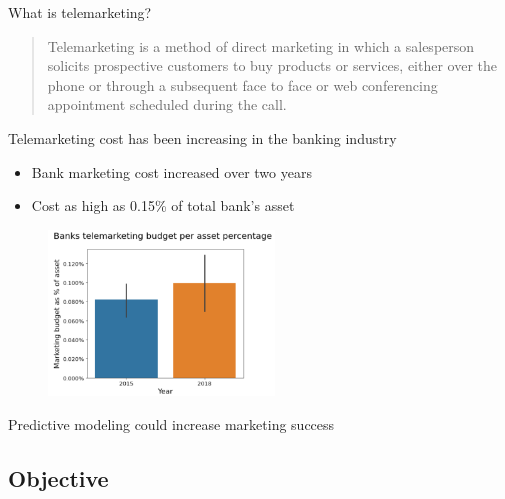 \begin{frame}{What is telemarketing?}

\begin{quote}
Telemarketing is a method of direct marketing in which a salesperson solicits prospective customers to buy products or services, either over the phone or through a subsequent face to face or web conferencing appointment scheduled during the call.
\end{quote}

\end{frame}


\begin{frame}{Telemarketing cost has been increasing in the banking industry}

\begin{itemize}
   \item Bank marketing cost increased over two years
	\item Cost as high as 0.15\% of total bank's asset 
\end{itemize}

	\begin{figure}
		
		\includegraphics[width=6.0cm]{figures/fig_bank_marketing_budget.PNG}
	\end{figure}
Predictive modeling could increase marketing success

\end{frame}


\subsection{Objective} %

